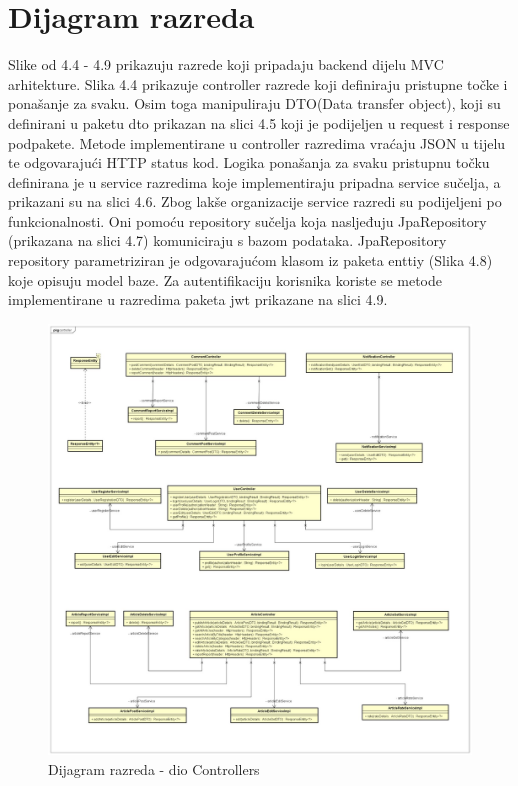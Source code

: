 \eject


\section{Dijagram razreda}

Slike od 4.4 - 4.9 prikazuju razrede koji pripadaju backend dijelu MVC arhitekture. Slika 4.4 prikazuje controller razrede koji definiraju pristupne točke i ponašanje za svaku. 
Osim toga manipuliraju DTO(Data transfer object), koji su definirani u paketu dto prikazan na slici 4.5 koji je podijeljen u request i response podpakete. 
Metode implementirane u controller razredima vraćaju JSON u tijelu te odgovarajući HTTP status kod. 
Logika ponašanja za svaku pristupnu točku definirana je u service razredima koje implementiraju pripadna service sučelja, a prikazani su na slici 4.6. 
Zbog lakše organizacije service razredi su podijeljeni po funkcionalnosti. Oni pomoću repository sučelja koja nasljeđuju JpaRepository (prikazana na slici 4.7) komuniciraju s bazom podataka.  
JpaRepository repository parametriziran je odgovarajućom klasom iz paketa enttiy (Slika 4.8) koje opisuju model baze. Za autentifikaciju korisnika koriste se metode implementirane u razredima paketa jwt prikazane na slici 4.9.

\eject

\begin{figure}[H]
	\includegraphics[scale=0.4]{slike/DijagramRazreda1.jpg}
	\centering
	\caption{Dijagram razreda - dio Controllers}
	\label{fig:class_diagram_controllers}
\end{figure}

